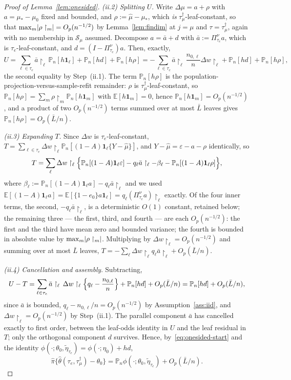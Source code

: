 \documentclass[11pt]{article}
\theoremstyle{plain}
\theoremstyle{definition}
\theoremstyle{remark}
\newcommand{\E}{\mathbb{E}}
\newcommand{\Pn}{\mathbb{P}_n}
\newcommand{\cS}{\mathcal{S}}
\newcommand{\ez}{e_0}
\newcommand{\mz}{\mu_0}
\newcommand{\mhat}{\widehat{\mu}}
\newcommand{\thetahat}{\widehat{\theta}}
\newcommand{\pihat}{\widehat{\pi}}
\DeclarePairedDelimiter{\abs}{\lvert}{\rvert}
\newcommand{\etatil}{\widetilde{\eta}}
\begin{document}
\begin{proof}[Proof of Lemma~\ref{lem:onesided}]
\emph{(ii.2) Splitting $U$.} Write $\Delta\mu=a+\rho$ with $a=\mu_*-\mz$ fixed
and bounded, and $\rho:=\mhat-\mu_*$, which \emph{is}
$\tau^\dagger_\mu$-leaf-constant, so that
$\max_{m}\abs{\rho\restriction_m}=O_p(n^{-1/2})$ by Lemma~\ref{lem:findim} at
$j=\mu$ and $\tau=\tau^\dagger_\mu$, again with no membership in $\cS_\mu$
assumed. Decompose $a=\bar a+d$ with $\bar a:=\Pi^\nu_{\tau_e}a$, which is
$\tau_e$-leaf-constant, and $d=(I-\Pi^\nu_{\tau_e})a$. Then, exactly,
\[
  U=\sum_{\ell\in\tau_e}\bar a\restriction_\ell\,\Pn[h\mathbf1_\ell]
   +\Pn[hd]+\Pn[h\rho]
  =-\sum_{\ell\in\tau_e}\bar a\restriction_\ell\,
    \frac{n_{0,\ell}}n\Delta w\restriction_\ell+\Pn[hd]+\Pn[h\rho],
\]
the second equality by Step~(ii.1). The term $\Pn[h\rho]$ is the
population-projection-versus-sample-refit remainder: $\rho$ is
$\tau^\dagger_\mu$-leaf-constant, so
$\Pn[h\rho]=\sum_m\rho\restriction_m\Pn[h\mathbf1_m]$ with
$\E[h\mathbf1_m]=0$, hence $\Pn[h\mathbf1_m]=O_p(n^{-1/2})$, and a product of
two $O_p(n^{-1/2})$ terms summed over at most $\bar L$ leaves gives
$\Pn[h\rho]=O_p(\bar L/n)$.

\emph{(ii.3) Expanding $T$.} Since $\Delta w$ is $\tau_e$-leaf-constant,
$T=\sum_{\ell\in\tau_e}\Delta w\restriction_\ell
\Pn[(1-A)\mathbf1_\ell\{Y-\mhat\}]$, and
$Y-\mhat=\varepsilon-a-\rho$ identically, so
\[
  T=\sum_{\ell}\Delta w\restriction_\ell
   \Bigl\{\Pn[(1-A)\mathbf1_\ell\varepsilon]
    -q_\ell\bar a\restriction_\ell-\beta_\ell
    -\Pn[(1-A)\mathbf1_\ell\rho]\Bigr\},
\]
where $\beta_\ell:=\Pn[(1-A)\mathbf1_\ell a]-q_\ell\bar a\restriction_\ell$ and
we used $\E[(1-A)\mathbf1_\ell a]=\E[\{1-\ez\}a\mathbf1_\ell]
=q_\ell(\Pi^\nu_{\tau_e}a)\restriction_\ell$ exactly. Of the four inner terms,
the second, $-q_\ell\bar a\restriction_\ell$, is a deterministic $O(1)$
constant, retained below; the remaining three --- the first, third, and
fourth --- are each
$O_p(n^{-1/2})$: the first and the third have mean zero and bounded
variance; the fourth is bounded in absolute value by
$\max_m\abs{\rho\restriction_m}$. Multiplying by
$\Delta w\restriction_\ell=O_p(n^{-1/2})$ and summing over at most $\bar L$
leaves,
$T=-\sum_\ell\Delta w\restriction_\ell q_\ell\bar a\restriction_\ell
+O_p(\bar L/n)$.

\emph{(ii.4) Cancellation and assembly.} Subtracting,
\[
  U-T=\sum_{\ell\in\tau_e}\bar a\restriction_\ell\,
   \Delta w\restriction_\ell\Bigl\{q_\ell-\frac{n_{0,\ell}}n\Bigr\}
   +\Pn[hd]+O_p(\bar L/n)=\Pn[hd]+O_p(\bar L/n),
\]
since $\bar a$ is bounded, $q_\ell-n_{0,\ell}/n=O_p(n^{-1/2})$ by
Assumption~\ref{ass:iid}, and $\Delta w\restriction_\ell=O_p(n^{-1/2})$ by
Step~(ii.1). The parallel component $\bar a$ has cancelled exactly to first
order, between the leaf-odds identity in $U$ and the leaf residual in $T$; only
the orthogonal component $d$ survives. Hence, by~\eqref{eq:onesided-start} and
the identity $\phi(\cdot;\theta_0,\etatil_{\tau_e})=\phi(\cdot;\eta_0)+hd$,
\[
  \pihat\{\thetahat(\tau_e,\tau^\dagger_\mu)-\theta_0\}
  =\Pn\phi(\cdot;\theta_0,\etatil_{\tau_e})+O_p(\bar L/n).
\]


\end{proof}
\end{document}
